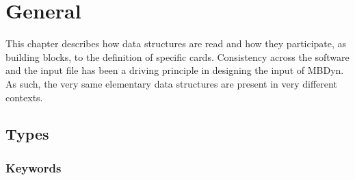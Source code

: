 %
%
%
%
%
% 
%
%

\chapter{General}\label{sec:GENERAL}
This chapter describes how data structures are read 
and how they participate, as building blocks, to the definition
of specific cards.
Consistency across the software and the input file has been 
a driving principle in designing the input of MBDyn.
As such, the very same elementary data structures are present
in very different contexts.



\section{Types}



\subsection{Keywords}




